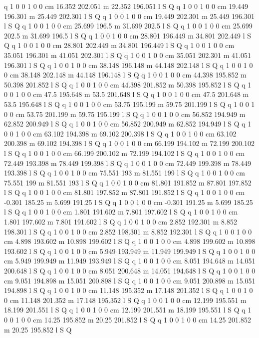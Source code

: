 q 1 0 0 1 0 0 cm
16.352 202.051 m 22.352 196.051 l S Q
q 1 0 0 1 0 0 cm
19.449 196.301 m 25.449 202.301 l S Q
q 1 0 0 1 0 0 cm
19.449 202.301 m 25.449 196.301 l S Q
q 1 0 0 1 0 0 cm
25.699 196.5 m 31.699 202.5 l S Q
q 1 0 0 1 0 0 cm
25.699 202.5 m 31.699 196.5 l S Q
q 1 0 0 1 0 0 cm
28.801 196.449 m 34.801 202.449 l S Q
q 1 0 0 1 0 0 cm
28.801 202.449 m 34.801 196.449 l S Q
q 1 0 0 1 0 0 cm
35.051 196.301 m 41.051 202.301 l S Q
q 1 0 0 1 0 0 cm
35.051 202.301 m 41.051 196.301 l S Q
q 1 0 0 1 0 0 cm
38.148 196.148 m 44.148 202.148 l S Q
q 1 0 0 1 0 0 cm
38.148 202.148 m 44.148 196.148 l S Q
q 1 0 0 1 0 0 cm
44.398 195.852 m 50.398 201.852 l S Q
q 1 0 0 1 0 0 cm
44.398 201.852 m 50.398 195.852 l S Q
q 1 0 0 1 0 0 cm
47.5 195.648 m 53.5 201.648 l S Q
q 1 0 0 1 0 0 cm
47.5 201.648 m 53.5 195.648 l S Q
q 1 0 0 1 0 0 cm
53.75 195.199 m 59.75 201.199 l S Q
q 1 0 0 1 0 0 cm
53.75 201.199 m 59.75 195.199 l S Q
q 1 0 0 1 0 0 cm
56.852 194.949 m 62.852 200.949 l S Q
q 1 0 0 1 0 0 cm
56.852 200.949 m 62.852 194.949 l S Q
q 1 0 0 1 0 0 cm
63.102 194.398 m 69.102 200.398 l S Q
q 1 0 0 1 0 0 cm
63.102 200.398 m 69.102 194.398 l S Q
q 1 0 0 1 0 0 cm
66.199 194.102 m 72.199 200.102 l S Q
q 1 0 0 1 0 0 cm
66.199 200.102 m 72.199 194.102 l S Q
q 1 0 0 1 0 0 cm
72.449 193.398 m 78.449 199.398 l S Q
q 1 0 0 1 0 0 cm
72.449 199.398 m 78.449 193.398 l S Q
q 1 0 0 1 0 0 cm
75.551 193 m 81.551 199 l S Q
q 1 0 0 1 0 0 cm
75.551 199 m 81.551 193 l S Q
q 1 0 0 1 0 0 cm
81.801 191.852 m 87.801 197.852 l S Q
q 1 0 0 1 0 0 cm
81.801 197.852 m 87.801 191.852 l S Q
q 1 0 0 1 0 0 cm
-0.301 185.25 m 5.699 191.25 l S Q
q 1 0 0 1 0 0 cm
-0.301 191.25 m 5.699 185.25 l S Q
q 1 0 0 1 0 0 cm
1.801 191.602 m 7.801 197.602 l S Q
q 1 0 0 1 0 0 cm
1.801 197.602 m 7.801 191.602 l S Q
q 1 0 0 1 0 0 cm
2.852 192.301 m 8.852 198.301 l S Q
q 1 0 0 1 0 0 cm
2.852 198.301 m 8.852 192.301 l S Q
q 1 0 0 1 0 0 cm
4.898 193.602 m 10.898 199.602 l S Q
q 1 0 0 1 0 0 cm
4.898 199.602 m 10.898 193.602 l S Q
q 1 0 0 1 0 0 cm
5.949 193.949 m 11.949 199.949 l S Q
q 1 0 0 1 0 0 cm
5.949 199.949 m 11.949 193.949 l S Q
q 1 0 0 1 0 0 cm
8.051 194.648 m 14.051 200.648 l S Q
q 1 0 0 1 0 0 cm
8.051 200.648 m 14.051 194.648 l S Q
q 1 0 0 1 0 0 cm
9.051 194.898 m 15.051 200.898 l S Q
q 1 0 0 1 0 0 cm
9.051 200.898 m 15.051 194.898 l S Q
q 1 0 0 1 0 0 cm
11.148 195.352 m 17.148 201.352 l S Q
q 1 0 0 1 0 0 cm
11.148 201.352 m 17.148 195.352 l S Q
q 1 0 0 1 0 0 cm
12.199 195.551 m 18.199 201.551 l S Q
q 1 0 0 1 0 0 cm
12.199 201.551 m 18.199 195.551 l S Q
q 1 0 0 1 0 0 cm
14.25 195.852 m 20.25 201.852 l S Q
q 1 0 0 1 0 0 cm
14.25 201.852 m 20.25 195.852 l S Q
